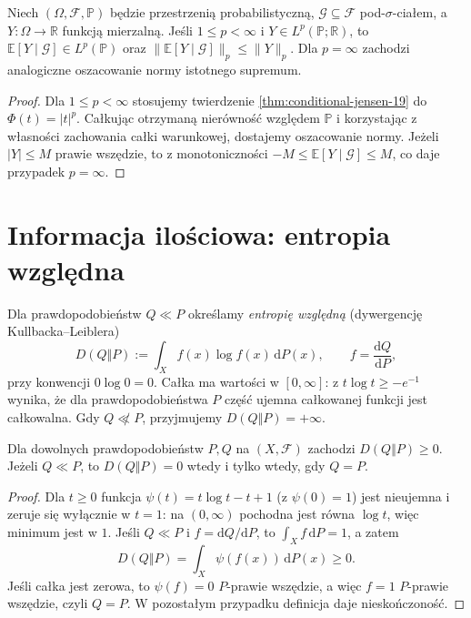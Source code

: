 \begin{wniosek}[Kontrakcja w $L^p$]
\label{cor:conditional-lp-19}
Niech $(\Omega,\mathcal F,\mathbb P)$ będzie przestrzenią probabilistyczną,
$\mathcal G\subseteq\mathcal F$ pod-$\sigma$-ciałem, a
$Y:\Omega\to\mathbb R$ funkcją mierzalną.
Jeśli $1\le p<\infty$ i $Y\in L^p(\mathbb P;\mathbb R)$,
to $\mathbb E[Y\mid\mathcal G]\in L^p(\mathbb P)$ oraz
$\|\mathbb E[Y\mid\mathcal G]\|_p\le\|Y\|_p$.
Dla $p=\infty$ zachodzi analogiczne oszacowanie
normy istotnego supremum.
\end{wniosek}
\begin{proof}
Dla $1\le p<\infty$ stosujemy twierdzenie
\ref{thm:conditional-jensen-19} do $\Phi(t)=|t|^p$.
Całkując otrzymaną nierówność względem $\mathbb P$
i korzystając z własności zachowania całki warunkowej,
dostajemy oszacowanie normy. Jeżeli $|Y|\le M$ prawie
wszędzie, to z monotoniczności
$-M\le\mathbb E[Y\mid\mathcal G]\le M$,
co daje przypadek $p=\infty$.
\end{proof}

\section{Informacja ilościowa: entropia względna}
Dla prawdopodobieństw $Q\ll P$ określamy
\emph{entropię względną} (dywergencję Kullbacka--Leiblera)
\[
 D(Q\Vert P):=\int_X f(x)\log f(x)\,\mathrm dP(x),
 \qquad f=\frac{\mathrm dQ}{\mathrm dP},
\]
przy konwencji $0\log0=0$. Całka ma wartości
w $[0,\infty]$: z $t\log t\ge -e^{-1}$
wynika, że dla prawdopodobieństwa $P$ część ujemna
całkowanej funkcji jest całkowalna. Gdy $Q\not\ll P$,
przyjmujemy $D(Q\Vert P)=+\infty$.

\begin{twierdzenie}
\label{thm:gibbs-19}
Dla dowolnych prawdopodobieństw $P,Q$ na $(X,\mathcal F)$
zachodzi $D(Q\Vert P)\ge0$. Jeżeli $Q\ll P$, to
$D(Q\Vert P)=0$ wtedy i tylko wtedy, gdy $Q=P$.
\end{twierdzenie}
\begin{proof}
Dla $t\ge0$ funkcja $\psi(t)=t\log t-t+1$
(z $\psi(0)=1$) jest nieujemna i zeruje się wyłącznie
w $t=1$: na $(0,\infty)$ pochodna jest równa $\log t$,
więc minimum jest w $1$. Jeśli $Q\ll P$ i $f=\mathrm dQ/\mathrm dP$,
to $\int_Xf\,\mathrm dP=1$, a zatem
\[
 D(Q\Vert P)=\int_X\psi(f(x))\,\mathrm dP(x)\ge0.
\]
Jeśli całka jest zerowa, to $\psi(f)=0$ $P$-prawie wszędzie,
a więc $f=1$ $P$-prawie wszędzie, czyli $Q=P$.
W pozostałym przypadku definicja daje nieskończoność.
\end{proof}


